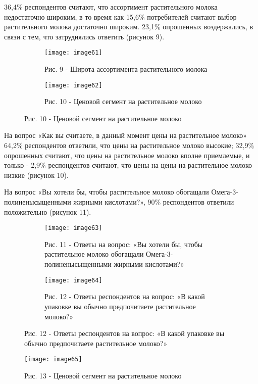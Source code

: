 36,4\% респондентов считают, что ассортимент растительного молока
недостаточно широким, в то время как 15,6\% потребителей считают выбор
растительного молока достаточно широким. 23,1\% опрошенных воздержались,
в связи с тем, что затруднялись ответить (рисунок 9).

\begin{figure}[H]
\begin{subfigure}[b]{0.45\textwidth}
\centering
\texttt{[image: image61]}
\caption*{Рис. 9 - Широта ассортимента растительного молока}
\end{subfigure}
\hspace{0.05\textwidth}
\begin{subfigure}[b]{0.45\textwidth}
\centering
\texttt{[image: image62]}
\caption*{Рис. 10 - Ценовой сегмент на растительное молоко}
\end{subfigure}
\end{figure}

На вопрос «Как вы считаете, в данный момент цены на растительное молоко»
64,2\% респондентов ответили, что цены на растительное молоко высокие;
32,9\% опрошенных считают, что цены на растительное молоко вполне
приемлемые, и только - 2,9\% респондентов считают, что цены на цены на
растительное молоко низкие (рисунок 10).

На вопрос «Вы хотели бы, чтобы растительное молоко обогащали
Омега-3-полиненысыщенными жирными кислотами?», 90\% респондентов
ответили положительно (рисунок 11).

\begin{figure}[H]
\begin{subfigure}[b]{0.45\textwidth}
\centering
\texttt{[image: image63]}
\caption*{Рис. 11 - Ответы на вопрос: «Вы хотели бы, чтобы растительное молоко
обогащали Омега-3-полиненысыщенными жирными кислотами?»}
\end{subfigure}
\hspace{0.05\textwidth}
\begin{subfigure}[b]{0.45\textwidth}
\centering
\texttt{[image: image64]}
\caption*{Рис. 12 - Ответы респондентов на вопрос: «В какой упаковке вы обычно предпочитаете растительное молоко?»}
\end{subfigure}
\end{figure}

\begin{figure}
\centering
\texttt{[image: image65]}
\caption*{Рис. 13 - Ценовой сегмент на растительное молоко}
\end{figure}

